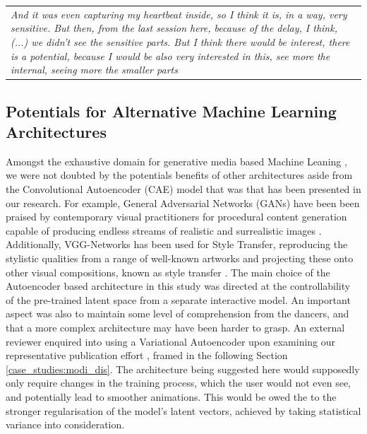 \begin{center}
\begin{tabular}{ p{13cm}}
\textit{And it was even capturing my heartbeat inside, so I think it is, in a way, very sensitive. But then, from the last session here, because of the delay, I think, (...) we didn't see the sensitive parts. But I think there would be interest, there is a potential, because I would be also very interested in this, see more the internal, seeing more the smaller parts}
\end{tabular}
\end{center}

\subsection*{Potentials for Alternative Machine Learning Architectures}
\label{subsec:alternative_ml}

Amongst the exhaustive domain for generative media based Machine Leaning \cite{hertzmann_aesthetics_2019}, we were not doubted by the potentials benefits of other architectures aside from the Convolutional Autoencoder (CAE) model that was that has been presented in our research. For example, General Adversarial Networks (GANs) have been been praised by contemporary visual practitioners for procedural content generation capable of producing endless streams of realistic and surrealistic images \cite{karras_style-based_2019,Elgammal2017CANCA}. Additionally, VGG-Networks has been used for Style Transfer, reproducing the stylistic qualities from a range of well-known artworks and projecting these onto other visual compositions, known as style transfer \cite{gatys_neural_2015}. The main choice of the Autoencoder based architecture in this study was directed at the controllability of the pre-trained latent space from a separate interactive model. An important aspect was also to maintain some level of comprehension from the dancers, and that a more complex architecture may have been harder to grasp.
An external reviewer enquired into using a Variational Autoencoder upon examining our representative publication effort \cite{correia_designing_2022}, framed in the following Section \ref{case_studies:modi_dis}. The architecture being suggested here would supposedly only require changes in the training process, which the user would not even see, and potentially lead to smoother animations. This would be owed the to the stronger regularisation of the model's latent vectors, achieved by taking statistical variance into consideration.

